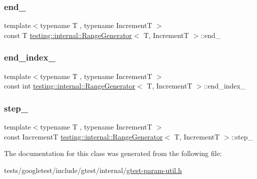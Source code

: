 \mbox{\label{classtesting_1_1internal_1_1RangeGenerator_ac36eecbaf80b51a59d59a4a4fdf5b5db}} 
\subsubsection{\texorpdfstring{end\+\_\+}{end\_}}
{\footnotesize\ttfamily template$<$typename T , typename IncrementT $>$ \\
const T \hyperlink{classtesting_1_1internal_1_1RangeGenerator}{testing\+::internal\+::\+Range\+Generator}$<$ T, IncrementT $>$\+::end\+\_\+\hspace{0.3cm}{\ttfamily [private]}}

\mbox{\label{classtesting_1_1internal_1_1RangeGenerator_a336878a1871133e49665df60ea944076}} 
\subsubsection{\texorpdfstring{end\+\_\+index\+\_\+}{end\_index\_}}
{\footnotesize\ttfamily template$<$typename T , typename IncrementT $>$ \\
const int \hyperlink{classtesting_1_1internal_1_1RangeGenerator}{testing\+::internal\+::\+Range\+Generator}$<$ T, IncrementT $>$\+::end\+\_\+index\+\_\+\hspace{0.3cm}{\ttfamily [private]}}

\mbox{\label{classtesting_1_1internal_1_1RangeGenerator_ae7f3c4b76d8610f030fdd12285ebd8fb}} 
\subsubsection{\texorpdfstring{step\+\_\+}{step\_}}
{\footnotesize\ttfamily template$<$typename T , typename IncrementT $>$ \\
const IncrementT \hyperlink{classtesting_1_1internal_1_1RangeGenerator}{testing\+::internal\+::\+Range\+Generator}$<$ T, IncrementT $>$\+::step\+\_\+\hspace{0.3cm}{\ttfamily [private]}}



The documentation for this class was generated from the following file\+:\begin{DoxyCompactItemize}
\item 
tests/googletest/include/gtest/internal/\hyperlink{gtest-param-util_8h}{gtest-\/param-\/util.\+h}\end{DoxyCompactItemize}
